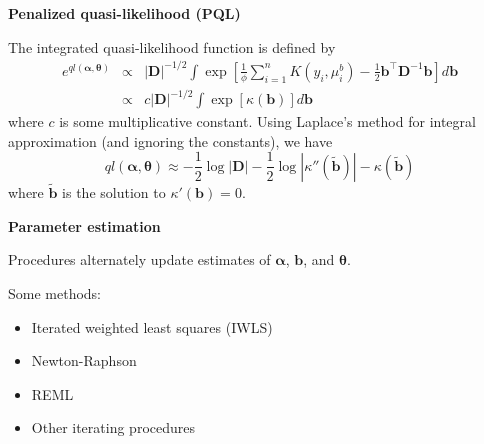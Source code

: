 \documentclass[mathserif, 10pt, t]{beamer}
\newcommand{\E}{\mathrm{E}}
\newcommand{\Var}{\mathrm{Var}}
\newcommand{\m}[1]{\mathbf{\bm{#1}}}
\renewcommand{\subtitle}[1]{\vspace{0.45cm}\textcolor{bluegreen}{
    {\textbf{#1}}}\vspace{0.15cm}\newline}
\begin{document}
\begin{frame}

\subtitle{Penalized quasi-likelihood (PQL)}

The integrated quasi-likelihood function is defined by
\begin{eqnarray*}
e^{ql(\m{\alpha}, \m{\theta})} &\propto& |\m{D}|^{-1/2}\int\exp\left[\frac{1}{\phi}\sum_{i=1}^nK(y_i,\mu_i^b)-\frac{1}{2}\m{b}^\top\m{D}^{-1}\m{b} \right]d\m{b} \\
&\propto& c|\m{D}|^{-1/2}\int\exp\left[ \kappa(\m{b}) \right] d\m{b} 
\end{eqnarray*}
where $c$ is some multiplicative constant. Using Laplace's method for integral approximation (and ignoring the constants), we have
\[ql(\m{\alpha}, \m{\theta}) \approx -\frac{1}{2}\log|\m{D}| -\frac{1}{2}\log|\kappa''(\tilde{\m{b}})| - \kappa(\tilde{\m{b}}) \]
where $\tilde{\m{b}}$ is the solution to $\kappa'(\m{b})=0$.

\end{frame}

% 
% 



\begin{frame}
\subtitle{Parameter estimation}

Procedures alternately update estimates of $\m{\alpha}$, $\m{b}$, and $\m{\theta}$.
\bigskip

Some methods:
\begin{itemize}[label={$\cdot$}]
\item Iterated weighted least squares (IWLS)
\item Newton-Raphson
\item REML
\item Other iterating procedures
\end{itemize}

\end{frame}
\end{document}
